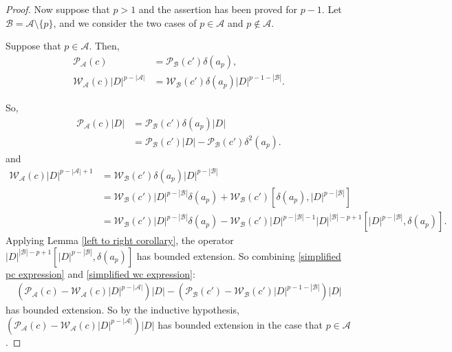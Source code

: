 \begin{proof}
        Now suppose that $p > 1$ and the assertion has been proved for $p-1$. Let $\mathscr{B} = \mathscr{A} \setminus \{p\}$, and we consider
        the two cases of $p \in \mathscr{A}$ and $p \notin \mathscr{A}$. 
        
        Suppose that $p \in \mathscr{A}$. Then,
        \begin{align*}
                         \mathcal{P}_{\mathscr{A}}(c) &= \mathcal{P}_{\mathscr{B}}(c')\delta(a_p),\\
            \mathcal{W}_{\mathscr{A}}(c)|D|^{p-|\mathscr{A}|} &= \mathcal{W}_{\mathscr{B}}(c')\delta(a_p)|D|^{p-1-|\mathscr{B}|}.
        \end{align*}
        
        So,
        \begin{align}\label{simplified pc expression} 
            \mathcal{P}_{\mathscr{A}}(c)|D| &= \mathcal{P}_{\mathscr{B}}(c')\delta(a_p)|D|\nonumber\\
                            &= \mathcal{P}_{\mathscr{B}}(c')|D|-\mathcal{P}_{\mathscr{B}}(c')\delta^2(a_p).
        \end{align}
        and
        \begin{align}\label{simplified wc expression}
            \mathcal{W}_{\mathscr{A}}(c)|D|^{p-|\mathscr{A}|+1} &= \mathcal{W}_{\mathscr{B}}(c')\delta(a_p)|D|^{p-|\mathscr{B}|}\nonumber\\
                                        &= \mathcal{W}_{\mathscr{B}}(c')|D|^{p-|\mathscr{B}|}\delta(a_p)+\mathcal{W}_{\mathscr{B}}(c')[\delta(a_p),|D|^{p-|\mathscr{B}|}]\nonumber\\
                                        &= \mathcal{W}_{\mathscr{B}}(c')|D|^{p-|\mathscr{B}|}\delta(a_p)-\mathcal{W}_{\mathscr{B}}(c')|D|^{p-|\mathscr{B}|-1}|D|^{|\mathscr{B}|-p+1}[|D|^{p-|\mathscr{B}|},\delta(a_p)].
        \end{align}
        Applying Lemma \ref{left to right corollary}, the operator $|D|^{|\mathscr{B}|-p+1}[|D|^{p-|\mathscr{B}|},\delta(a_p)]$ has bounded extension. 
        So combining \eqref{simplified pc expression} and \eqref{simplified wc expression}:
        \begin{align*}
            (\mathcal{P}_{\mathscr{A}}(c)-\mathcal{W}_{\mathscr{A}}(c)|D|^{p-|\mathscr{A}|})|D| - (\mathcal{P}_{\mathscr{B}}(c')-\mathcal{W}_{\mathscr{B}}(c')|D|^{p-1-|\mathscr{B}|})|D|
        \end{align*}
        has bounded extension. So by the inductive hypothesis, $(\mathcal{P}_{\mathscr{A}}(c)-\mathcal{W}_{\mathscr{A}}(c)|D|^{p-|\mathscr{A}|})|D|$ has bounded extension in the case that $p \in \mathscr{A}$.
        

\end{proof}
